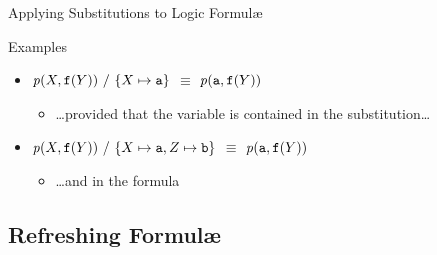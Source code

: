 \documentclass[presentation]{beamer}\mode<presentation>{\usetheme{AMSBolognaFC}}
\begin{document}
\begin{frame}[allowframebreaks]{Applying Substitutions to Logic Formul\ae{}}
\begin{exampleblock}{Examples}
\begin{itemize}
			\item[] \alert{$\text{\textit{p}}(X, \mathtt{f}(Y)) \ /\  \{ X \mapsto \mathtt{a} \}$} $\equiv$ $\text{\textit{p}}(\mathtt{a}, \mathtt{f}(Y))$
			\begin{itemize}
				\item \ldots provided that the variable is contained in the substitution\ldots
			\end{itemize} 

			\item[] \alert{$\text{\textit{p}}(X, \mathtt{f}(Y)) \ /\  \{ X \mapsto \mathtt{a}, Z \mapsto \mathtt{b} \}$} $\equiv$ $\text{\textit{p}}(\mathtt{a}, \mathtt{f}(Y))$
			\begin{itemize}
				\item \ldots and in the formula
			\end{itemize} 
        \end{itemize}
    \end{exampleblock}
\end{frame}

\subsection{Refreshing Formul\ae{}}
\end{document}
